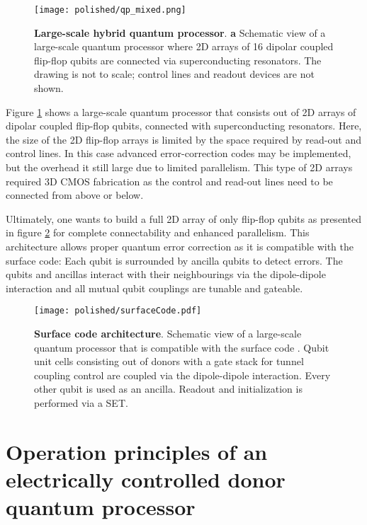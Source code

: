 \begin{figure}
	\centering
	\texttt{[image: polished/qp\_mixed.png]}
	\caption[Large-scale hybrid quantum processor]{\textbf{Large-scale hybrid quantum processor}.
		\textbf{a} Schematic view of a large-scale quantum processor where 2D arrays of 16 dipolar coupled flip-flop qubits are connected via superconducting resonators. The drawing is not to scale; control lines and readout devices are not shown.}
	\label{fig:qp_mixed}
\end{figure}

Figure \ref{fig:qp_mixed} shows a large-scale quantum processor that consists out of 2D arrays of dipolar coupled flip-flop qubits, connected with superconducting resonators. Here, the size of the 2D flip-flop arrays is limited by the space required by read-out and control lines. In this case advanced error-correction codes may be implemented\cite{Knill2005,Nickerson2013,Terhal2015,Li2018a}, but the overhead it still large due to limited parallelism. This type of 2D arrays required 3D CMOS fabrication as the control and read-out lines need to be connected from above or below. 

Ultimately, one wants to build a full 2D array of only flip-flop qubits as presented in figure \ref{fig:qp_surfaceCode} for complete connectability and enhanced parallelism. This architecture allows proper quantum error correction as it is compatible with the surface code\cite{Fowler2012}: Each qubit is surrounded by ancilla qubits to detect errors. The qubits and ancillas interact with their neighbourings via the dipole-dipole interaction and all mutual qubit couplings are tunable and gateable. 

\begin{figure}
	\centering
	\texttt{[image: polished/surfaceCode.pdf]}
	\caption[Surface code architecture]{\textbf{Surface code architecture}. Schematic view of a large-scale quantum processor that is compatible with the surface code \cite{Fowler2012}. Qubit unit cells consisting out of donors with a gate stack for tunnel coupling control are coupled via the dipole-dipole interaction. Every other qubit is used as an ancilla. Readout and initialization is performed via a SET. }
	\label{fig:qp_surfaceCode}
\end{figure}



\section{Operation principles of an electrically controlled donor quantum processor}

